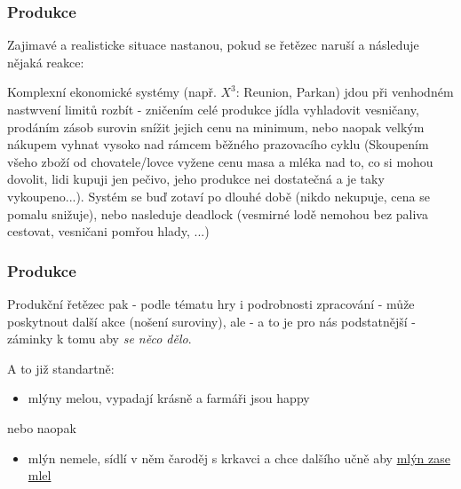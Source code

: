 ﻿\documentclass[a4paper]{beamer}
\begin{document}
\begin{frame}
\frametitle{Produkce}

Zajimavé a realisticke situace nastanou, pokud se řetězec naruší a následuje nějaká reakce:
    
    \vfill
    Komplexní ekonomické systémy (např. $X^3$: Reunion, Parkan) jdou při venhodném nastwvení limitů rozbít - zničením celé produkce jídla vyhladovit vesničany, prodáním zásob surovin snížit jejich cenu na minimum, nebo naopak velkým nákupem vyhnat vysoko nad rámcem běžného prazovacího cyklu (Skoupením všeho zboží od chovatele/lovce vyžene cenu masa a mléka nad to, co si mohou dovolit, lidi kupuji jen pečivo, jeho produkce nei dostatečná a je taky vykoupeno...). Systém se buď zotaví po dlouhé době (nikdo nekupuje, cena se pomalu snižuje), nebo nasleduje deadlock (vesmirné lodě nemohou bez paliva cestovat, vesničani pomřou hlady, ...)
    \vfill
    
\end{frame}

\begin{frame}
\frametitle{Produkce}

Produkční řetězec pak - podle tématu hry i podrobnosti zpracování - může poskytnout další akce (nošení suroviny), ale - a to je pro nás podstatnější - záminky k tomu aby \emph{se něco dělo}.

A to již standartně:

\begin{itemize}
    \item mlýny melou, vypadají krásně a farmáři jsou happy
\end{itemize}

nebo naopak

\begin{itemize}
    \item mlýn nemele, sídlí v něm čaroděj s krkavci a chce dalšího učně aby \href{https://youtu.be/naeZCLKqppY}{mlýn zase mlel}
\end{itemize}

\end{frame}
\end{document}
